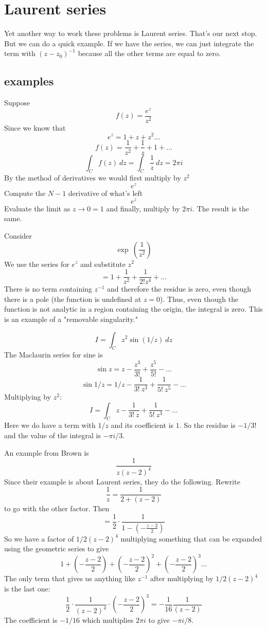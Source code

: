 \documentclass[11pt, oneside]{article}   	%
\begin{document}
\section*{Laurent series}
Yet another way to work these problems is Laurent series.  That's our next stop.  But we can do a quick example.  If we have the series, we can just integrate the term with $(z-z_0)^{-1}$ because all the other terms are equal to zero.
\subsection*{examples}
Suppose
\[ f(z) = \frac{e^z}{z^2} \]
Since we know that 
\[ e^z = 1 + z + z^2 \dots \]
\[ f(z) = \frac{1}{z^2} + \frac{1}{z} + 1 + \dots \]
\[ \int_C f(z) \ dz = \int_C \frac{1}{z} \ dz = 2 \pi i \]
By the method of derivatives we would first multiply by $z^2$
\[ e^z \]
Compute the $N-1$ derivative of what's left 
\[ e^z \]
Evaluate the limit as $z \rightarrow 0 = 1$ and finally, multiply by $2 \pi i$.  The result is the same.  

Consider
\[ \exp \ (\frac{1}{z^2}) \]
We use the series for $e^z$ and substitute $z^2$
\[ = 1 + \frac{1}{z^2} + \frac{1}{2! z^4} + \dots \]
There is no term containing $z^{-1}$ and therefore the residue is zero, even though there is a pole (the function is undefined at $z = 0$).  Thus, even though the function is not analytic in a region containing the origin, the integral is zero.  This is an example of a "removable singularity."

\[ I = \int_C z^2 \sin (1/z) \ dz \]
The Maclaurin series for sine is
\[ \sin z = z - \frac{z^3}{3!} + \frac{z^5}{5!} - \dots \]
\[ \sin1/ z = 1/z - \frac{1}{3! \ z^3} + \frac{1}{5! \ z^5} - \dots \]
Multiplying by $z^2$:
\[ I = \int_C z - \frac{1}{3! \ z} +  \frac{1}{5! \ z^3} - \dots \]
Here we do have a term with $1/z$ and its coefficient is $1$.  So the residue is $-1/3!$ and the value of the integral is $- \pi i/3$.

An example from Brown is 
\[ \frac{1}{z(z-2)^4} \]
Since their example is about Laurent series, they do the following.  Rewrite
\[ \frac{1}{z} = \frac{1}{2 + (z - 2)} \]
to go with the other factor.  Then
\[ = \frac{1}{2} \cdot \frac{1}{1 - (- \frac{z - 2}{2})} \]
So we have a factor of $1/2(z-2)^4$ multiplying something that can be expanded using the geometric series to give
\[ 1 + (-\frac{z - 2}{2}) + (-\frac{z - 2}{2})^2 + (-\frac{z - 2}{2})^3 \dots \]
The only term that gives us anything like $z^{-1}$ after multiplying by $1/2(z-2)^4$ is the last one:
\[ \frac{1}{2} \cdot \frac{1}{(z-2)^4} \cdot (-\frac{z - 2}{2})^3 = - \frac{1}{16} \frac{1}{(z-2)}   \]
The coefficient is $-1/16$ which multiplies $2 \pi i$ to give $-\pi i/8$.
\end{document}
